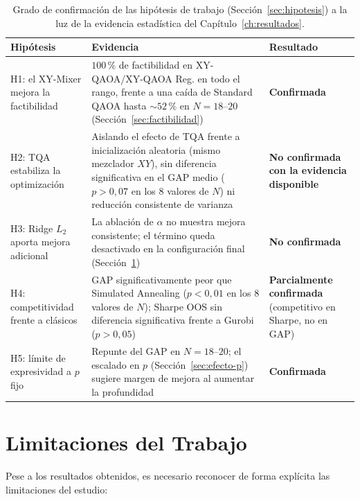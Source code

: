 \begin{table}[htbp]
\centering
\small
\begin{tabular}{p{2.6cm}p{7.2cm}p{2.8cm}}
\toprule
\textbf{Hipótesis} & \textbf{Evidencia} & \textbf{Resultado} \\
\midrule
H1: el XY-Mixer mejora la factibilidad &
$100\,\%$ de factibilidad en XY-QAOA/XY-QAOA Reg. en todo el rango, frente a una caída de
Standard QAOA hasta $\sim\!52\,\%$ en $N=18$--$20$ (Sección~\ref{sec:factibilidad}) &
\textbf{Confirmada} \\
\addlinespace
H2: TQA estabiliza la optimización &
Aislando el efecto de TQA frente a inicialización aleatoria (mismo mezclador $XY$), sin
diferencia significativa en el GAP medio ($p>0{,}07$ en los 8 valores de $N$) ni reducción
consistente de varianza &
\textbf{No confirmada con la evidencia disponible} \\
\addlinespace
H3: Ridge $L_2$ aporta mejora adicional &
La ablación de $\alpha$ no muestra mejora consistente; el término queda desactivado en la
configuración final (Sección~\ref{sec:limitaciones}) &
\textbf{No confirmada} \\
\addlinespace
H4: competitividad frente a clásicos &
GAP significativamente peor que Simulated Annealing ($p<0{,}01$ en los 8 valores de $N$);
Sharpe OOS sin diferencia significativa frente a Gurobi ($p>0{,}05$) &
\textbf{Parcialmente confirmada} (competitivo en Sharpe, no en GAP) \\
\addlinespace
H5: límite de expresividad a $p$ fijo &
Repunte del GAP en $N=18$--$20$; el escalado en $p$ (Sección~\ref{sec:efecto-p}) sugiere
margen de mejora al aumentar la profundidad &
\textbf{Confirmada} \\
\bottomrule
\end{tabular}
\caption{Grado de confirmación de las hipótesis de trabajo (Sección~\ref{sec:hipotesis}) a la luz
de la evidencia estadística del Capítulo~\ref{ch:resultados}.}
\label{tab:hipotesis}
\end{table}

\section{Limitaciones del Trabajo}
\label{sec:limitaciones}

Pese a los resultados obtenidos, es necesario reconocer de forma explícita las limitaciones del estudio:

